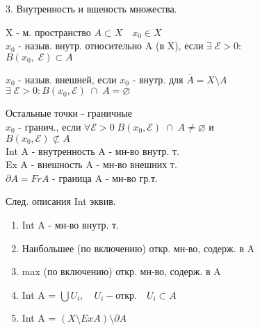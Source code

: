 \documentclass[11pt, fleqn]{article}
\begin{document}
    \begin{question}{3. Внутренность и вшеность множества.}
        \begin{definition} 
            X - м. пространство $A \subset X \quad x_0 \in X$\\
            $x_0$ - назыв. внутр. относительно A (в X), если $\exists \; \mathcal{E} > 0:$\\
            $B(x_0, \; \mathcal{E}) \subset A$
        \end{definition}

        \begin{definition} 
            $x_0$ - назыв. внешней, если $x_0$ - внутр. для $\overline{A} = X \setminus A$\\
            $\exists \; \mathcal{E} > 0 : B(x_0, \mathcal{E}) \; \cap \; A = \varnothing$
        \end{definition}

        \begin{definition} 
            Остальные точки - граничные\\
            $x_0$ - гранич., если $\forall \mathcal{E} > 0 \; B(x_0, \mathcal{E}) \; \cap \; A \neq \varnothing$ и\\
            $B(x_0, \mathcal{E}) \not\subset A$\\
            Int A - внутренность A - мн-во внутр. т.\\
            Ex A - внешность A - мн-во внешних т.\\
            $\partial A = Fr A$ - граница A - мн-во гр.т.
        \end{definition}

        \begin{theorem} 
            След. описания Int эквив.\\
            \begin{enumerate}
                \item Int A - мн-во внутр. т.
                \item Наибольшее (по включению) откр. мн-во, содерж. в A
                \item max (по включению) откр. мн-во, содерж. в A
                \item Int A = $\bigcup U_i, \quad U_i - \text{откр.} \quad U_i \subset A$
                \item Int A = $(X \setminus Ex A) \setminus \partial A$ 
            \end{enumerate}
        \end{theorem}


\end{question}
\end{document}
